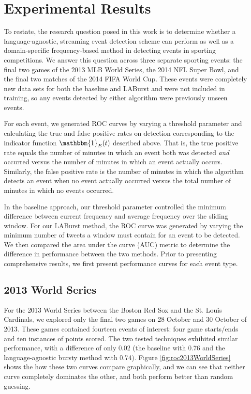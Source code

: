 \documentclass{sig-alternate}
\begin{document}
\section{Experimental Results}
\label{sect:results}

To restate, the research question posed in this work is to determine whether a language-agnostic, streaming event detection scheme can perform as well as a domain-specific frequency-based method in detecting events in sporting competitions.
We answer this question across three separate sporting events: the final two games of the 2013 MLB World Series, the 2014 NFL Super Bowl, and the final two matches of the 2014 FIFA World Cup.
These events were completely new data sets for both the baseline and LABurst and were not included in training, so any events detected by either algorithm were previously unseen events.

For each event, we generated ROC curves by varying a threshold parameter and calculating the true and false positive rates on detection corresponding to the indicator function $\mathbbm{1}_E(t)$ described above.
That is, the true positive rate equals the number of minutes in which an event both was detected \emph{and} occurred versus the number of minutes in which an event actually occurs.
Similarly, the false positive rate is the number of minutes in which the algorithm detects an event when no event actually occurred versus the total number of minutes in which no events occurred.

In the baseline approach, our threshold parameter controlled the minimum difference between current frequency and average frequency over the sliding window.
For our LABurst method, the ROC curve was generated by varying the minimum number of tweets a window must contain for an event to be detected.
We then compared the area under the curve (AUC) metric to determine the difference in performance between the two methods.
Prior to presenting comprehensive results, we first present performance curves for each event type.

\subsection{2013 World Series}

For the 2013 World Series between the Boston Red Sox and the St. Louis Cardinals, we explored only the final two games on 28 October and 30 October of 2013.
These games contained fourteen events of interest: four game starts/ends and ten instances of points scored.
The two tested techniques exhibited similar performance, with a difference of only 0.02 (the baseline with 0.76 and the language-agnostic bursty method with 0.74).
Figure \ref{fig:roc2013WorldSeries} shows the how these two curves compare graphically, and we can see that neither curve completely dominates the other, and both perform better than random guessing.
\end{document}
